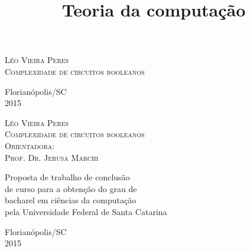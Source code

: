 \title{Teoria da computação}
\author{}
\date{}



\begin{titlepage}

\begin{center}

\textsc{\Large Léo Vieira Peres} \\[5.0cm]
\textsc{\LARGE Complexidade de circuitos booleanos}

\vfill

Florianópolis/SC \\ 2015

\end{center}

\end{titlepage}

\begin{center}

\textsc{\Large Léo Vieira Peres} \\[5.0cm]
\textsc{\LARGE Complexidade de circuitos booleanos} \\[3.0cm]
\textsc{\large Orientadora: \\ Prof. Dr. Jerusa Marchi } \\[4.0cm]

\begin{flushright}

\large Proposta de trabalho de conclusão \\ de curso para a obtenção do grau de \\ bacharel em ciências da computação \\ pela Universidade Federal de Santa Catarina

\end{flushright}
\vfill

Florianópolis/SC \\ 2015


\end{center}

\pagebreak

\tableofcontents

\pagebreak

